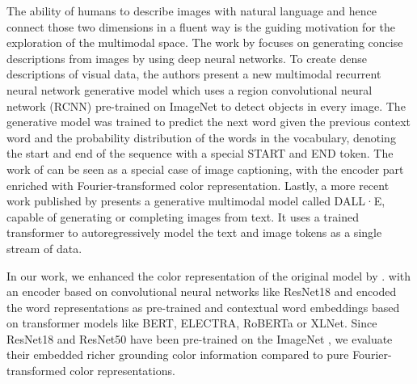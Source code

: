 \par
The ability of humans to describe images with natural language and hence connect those two dimensions in a fluent way is the guiding motivation for the exploration of the multimodal space. The work by \citep{karpathy-2014-image_descriptions} focuses on generating concise descriptions from images by using deep neural networks. To create dense descriptions of visual data, the authors present a new multimodal recurrent neural network generative model which uses a region convolutional neural network (RCNN) pre-trained on ImageNet \citep{deng-2009-imagenet} to detect objects in every image. The generative model was trained to predict the next word given the previous context word and the probability distribution of the words in the vocabulary, denoting the start and end of the sequence with a special START and END token. The work of \citep{monroe-2017-colors} can be seen as a special case of image captioning, with the encoder part enriched with Fourier-transformed color representation. Lastly, a more recent work published by \citep{openai-2020-dalle} presents a generative multimodal model called DALL·E, capable of generating or completing images from text. It uses a trained transformer to autoregressively model the text and image tokens as a single stream of data.

\par
In our work, we enhanced the color representation of the original model by \citep{monroe-2017-colors}. with an encoder based on convolutional neural networks like ResNet18 and encoded the word representations as pre-trained and contextual word embeddings based on transformer models like BERT, ELECTRA, RoBERTa or XLNet. Since ResNet18 and ResNet50 have been pre-trained on the ImageNet \citep{imagenet-2019-dataset}, we evaluate their embedded richer grounding color information compared to pure Fourier-transformed color representations.
